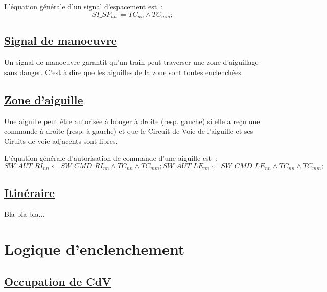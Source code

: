 \medskip
L'équation générale d'un signal d'espacement est~:
$$\boxed{
  SI\_SP_{nn} \Leftarrow TC_{nn} \land TC_{mm};
}$$


\subsection{\underline{Signal de manoeuvre}}
\label{sec:esp}

Un signal de manoeuvre garantit qu'un train peut traverser une zone
d'aiguillage sans danger. C'est à dire que les aiguilles de la zone
sont toutes enclenchées.




\subsection{\underline{Zone d'aiguille}}
\label{sec:aig}

Une aiguille peut être autorisée à bouger à droite (resp. gauche) 
si elle a reçu une commande à droite (resp. à gauche) et que le 
Circuit de Voie de l'aiguille et ses Ciruits de voie adjacents
sont libres. 

\medskip
L'équation générale d'autorisation de commande d'une aiguille est~:
$$\boxed{
  SW\_AUT\_RI_{nn} \Leftarrow SW\_CMD\_RI_{nn} \land TC_{nn} \land TC_{mm} ;
  SW\_AUT\_LE_{nn} \Leftarrow SW\_CMD\_LE_{nn} \land TC_{nn} \land TC_{mm} ;
}$$


\subsection{\underline{Itinéraire}}
\label{sec:iti}

Bla bla bla...

\section{Logique d'enclenchement}
\label{sec:logic}
\subsection{\underline{Occupation de CdV}}
\label{sec:cdv_occ}


